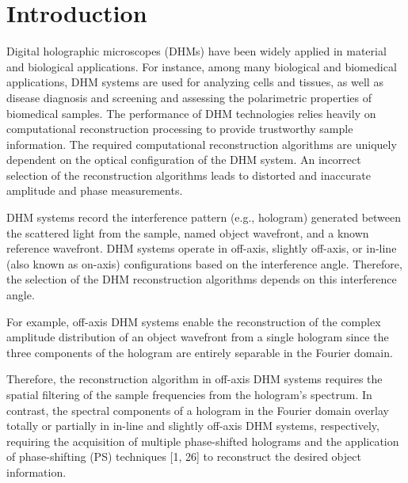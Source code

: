 \section{Introduction}

Digital holographic microscopes (DHMs) have been widely applied in material and biological
applications. For instance, among many biological and biomedical applications, DHM
systems are used for analyzing cells and tissues, as well as disease diagnosis and screening
 and assessing the polarimetric properties of biomedical samples.
The performance of DHM technologies relies heavily on computational reconstruction processing to provide trustworthy
sample information. The required computational reconstruction algorithms are uniquely
dependent on the optical configuration of the DHM system. An incorrect selection of the
reconstruction algorithms leads to distorted and inaccurate amplitude and phase measurements. 

DHM systems record the interference pattern (e.g., hologram) generated between the scattered light from the sample, named object wavefront, and a known reference wavefront.
DHM systems operate in off-axis, slightly off-axis, or in-line (also known as on-axis) configurations based on the interference angle.
Therefore, the selection of the DHM reconstruction
algorithms depends on this interference angle. 

For example, off-axis DHM systems enable the
reconstruction of the complex amplitude distribution of an object wavefront from a single hologram since the three components of the hologram are entirely separable in the Fourier
domain.

Therefore, the reconstruction algorithm in off-axis DHM systems requires the spatial filtering of the sample frequencies from the hologram’s spectrum. In contrast, the
spectral components of a hologram in the Fourier domain overlay totally or partially in in-line
and slightly off-axis DHM systems, respectively, requiring the acquisition of multiple phase-shifted holograms and the application of phase-shifting (PS) techniques [1, 26] to reconstruct the desired object information. 

